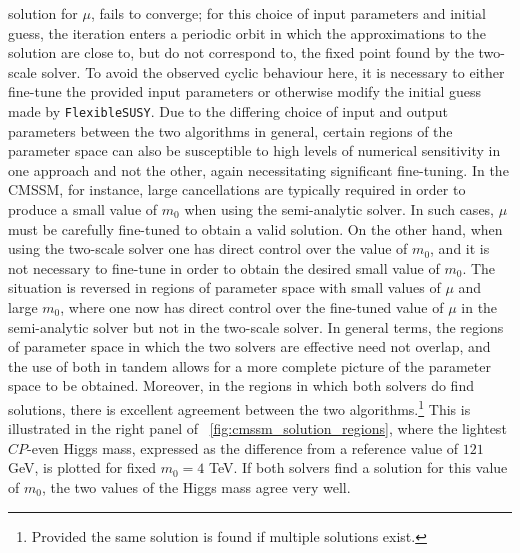 \documentclass[final,3p,11pt,pdflatex]{elsarticle}
\makeatletter
\newcommand{\fs}{\texttt{FlexibleSUSY}\@\xspace}
\newcommand{\figref}[1]{\figurename~\ref{#1}}
\newcommand{\CP}{\ensuremath{CP}\xspace}
\newcommand{\mzero}{\ensuremath{m_0}\xspace}
\makeatother
\begin{document}
solution for $\mu$, fails to converge; for this choice of input parameters
and initial guess, the iteration enters a periodic orbit in which the
approximations to the solution are close to, but do not correspond to, the
fixed point found by the two-scale solver.  To avoid the observed cyclic
behaviour here, it is necessary to either fine-tune the provided input
parameters or otherwise modify the initial guess made by \fs.  Due to the
differing choice of input and output parameters between the two algorithms
in general, certain regions of the parameter space can also be susceptible to
high levels of numerical sensitivity in one approach and not the other,
again necessitating significant fine-tuning.  In the CMSSM, for instance,
large cancellations are typically required in
order to produce a small value of $m_0$ when using the semi-analytic solver.
In such cases, $\mu$ must be carefully fine-tuned to obtain a valid solution.
On the other hand, when using the two-scale solver one has direct control over
the value of $m_0$, and it is not necessary to fine-tune in order to obtain
the desired small value of $m_0$.  The situation is reversed in regions of
parameter space with small values of $\mu$ and large $m_0$, where one now
has direct control over the fine-tuned value of $\mu$ in the semi-analytic
solver but not in the two-scale solver.  In general terms, the regions of
parameter space in which the two solvers are effective need not overlap, and
the use of both in tandem allows for a more complete picture of the parameter
space to be obtained.  Moreover, in the regions in which both solvers do find
solutions, there is excellent agreement between the two algorithms.\footnote{
  Provided the same solution is found if multiple solutions exist.}  This is
illustrated in the right panel of \figref{fig:cmssm_solution_regions}, where
the lightest \CP-even Higgs mass, expressed as the difference from a reference
value of $121$ GeV, is plotted for fixed $\mzero = 4$ TeV\@.  If both solvers
find a solution for this value of $\mzero$, the two values of the Higgs mass
agree very well.
\end{document}
